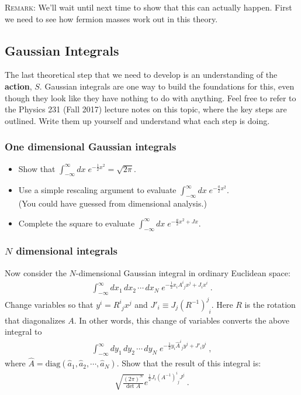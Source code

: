 \documentclass[12pt]{article}
\begin{document}
\textsc{Remark}: We'll wait until next time to show that this can actually happen. First we need to see how fermion masses work out in this theory.


\subsection{Gaussian Integrals}

The last theoretical step that we need to develop is an understanding of the \textbf{action}, $S$. Gaussian integrals are one way to build the foundations for this, even though they look like they have nothing to do with anything. Feel free to refer to the Physics 231 (Fall 2017) lecture notes on this topic, where the key steps are outlined. Write them up yourself and understand what each step is doing.

\subsubsection{One dimensional Gaussian integrals}

\begin{itemize}
	\item Show that $\int_{-\infty}^\infty dx\; e^{-\frac 12 x^2} = \sqrt{2\pi}$.
	\item Use a simple rescaling argument to evaluate $\int_{-\infty}^\infty dx\; e^{-\frac a2 x^2}$. \\(You could have guessed from dimensional analysis.)
	\item Complete the square to evaluate $\int_{-\infty}^\infty dx\; e^{-\frac a2 x^2 + Jx}$.
\end{itemize}

\subsubsection{$N$ dimensional integrals}

Now consider the $N$-dimensional Gaussian integral in ordinary Euclidean space:
\begin{align}
	\int_{-\infty}^\infty
	dx_1 \, dx_2 \, \cdots \, dx_N \;
	e^{-\frac 12 x_i  A^i_{\phantom{i}j} x^j  + J_i x^i} \ .
\end{align}
Change variables so that $y^i = R^i_{\phantom{i}j}  x^j$ and $J'_i \equiv J_j(R^{-1})^j_{\phantom{j}i}$. Here $R$ is the rotation that diagonalizes $A$. In other words, this change of variables converts the above integral to
\begin{align}
	\int_{-\infty}^\infty
	dy_1 \, dy_2 \, \cdots \, dy_N \;
	e^{-\frac 12 y_i \hat{A}^i_{\phantom{i}j}  y^j  + J'_i y^i} \ ,
\end{align}
where $\hat A = \text{diag}(\hat a_1, \hat a_2, \cdots, \hat a_N)$. Show that the result of this integral is:
\begin{align}
	\sqrt{\frac{(2\pi)^N}{\text{det }A}} e^{\frac 12 J_i (A^{-1})^i_{\phantom{i}j} J^j} \ .
\end{align}
\end{document}
